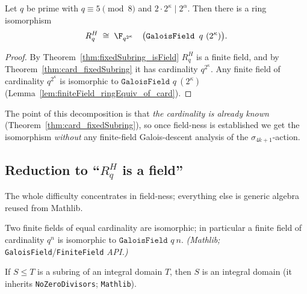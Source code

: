 \begin{theorem}\label{thm:fixedSubring_equiv_galoisField}
\leanok
{}
Let $q$ be prime with $q \equiv 5 \pmod 8$ and $2 \cdot 2^\kappa \mid 2^\alpha$. Then there is a
ring isomorphism
\[
  R_q^{H} \;\cong\; \F_{q^{2^\kappa}} \quad\bigl(\texttt{GaloisField } q\ (2^\kappa)\bigr).
\]
\end{theorem}

\begin{proof}
\leanok{}
By Theorem~\ref{thm:fixedSubring_isField} $R_q^H$ is a finite field, and by
Theorem~\ref{thm:card_fixedSubring} it has cardinality $q^{2^\kappa}$. Any finite field of
cardinality $q^{2^\kappa}$ is isomorphic to $\texttt{GaloisField } q\ (2^\kappa)$
(Lemma~\ref{lem:finiteField_ringEquiv_of_card}).
\end{proof}

\noindent
The point of this decomposition is that \emph{the cardinality is already known}
(Theorem~\ref{thm:card_fixedSubring}), so once field-ness is established we get the isomorphism
\emph{without} any finite-field Galois-descent analysis of the $\sigma_{4k+1}$-action.

\subsection{Reduction to ``\texorpdfstring{$R_q^H$}{R\_q\^{}H} is a field''}

The whole difficulty concentrates in field-ness; everything else is generic algebra reused from
Mathlib.

\begin{lemma}\label{lem:finiteField_ringEquiv_of_card}
Two finite fields of equal cardinality are isomorphic; in particular a finite field of
cardinality $q^{n}$ is isomorphic to $\texttt{GaloisField } q\ n$. \emph{(Mathlib;}
\texttt{GaloisField}/\texttt{FiniteField} \emph{API.)}
\end{lemma}

\begin{lemma}\label{lem:subring_isDomain}
If $S \le T$ is a subring of an integral domain $T$, then $S$ is an integral domain
(it inherits \texttt{NoZeroDivisors}; \texttt{Mathlib}).
\end{lemma}

